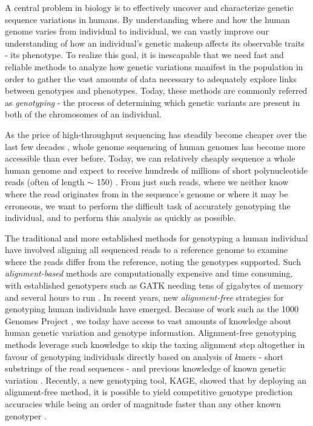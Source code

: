 A central problem in biology is to effectively uncover and characterize genetic sequence variations in humans.
By understanding where and how the human genome varies from individual to individual, we can vastly improve our understanding of how an individual's genetic makeup affects its observable traits - its phenotype.
To realize this goal, it is inescapable that we need fast and reliable methods to analyze how genetic variations manifest in the population in order to gather the vast amounts of data necessary to adequately explore links between genotypes and phenotypes.
Today, these methods are commonly referred as \textit{genotyping} - the process of determining which genetic variants are present in both of the chromosomes of an individual.

As the price of high-throughput sequencing has steadily become cheaper over the last few decades \cite{nhgri_sequencing_cost}, whole genome sequencing of human genomes has become more accessible than ever before.
Today, we can relatively cheaply sequence a whole human genome and expect to receive hundreds of millions of short polynucleotide reads (often of length $\sim$ 150) \cite{illumina_read_length}.
From just such reads, where we neither know where the read originates from in the sequence's genome or where it may be erroneous, we want to perform the difficult task of accurately genotyping the individual, and to perform this analysis as quickly as possible.

The traditional and more established methods for genotyping a human individual have involved aligning all sequenced reads to a reference genome to examine where the reads differ from the reference, noting the genotypes supported.
Such \textit{alignment-based} methods are computationally expensive and time consuming, with established genotypers such as GATK \cite{gatk} needing tens of gigabytes of memory and several hours to run \cite{kage}.
In recent years, new \textit{alignment-free} strategies for genotyping human individuals have emerged.
Because of work such as the 1000 Genomes Project \cite{1000_genomes_project}, we today have access to vast amounts of knowledge about human genetic variation and genotype information.
Alignment-free genotyping methods leverage such knowledge to skip the taxing alignment step altogether in favour of genotyping individuals directly based on analysis of \textit{k}mers - short substrings of the read sequences - and previous knowledge of known genetic variation \cite{kage,malva}.
Recently, a new genotyping tool, KAGE, showed that by deploying an alignment-free method, it is possible to yield competitive genotype prediction accuracies while being an order of magnitude faster than any other known genotyper \cite{kage}.

